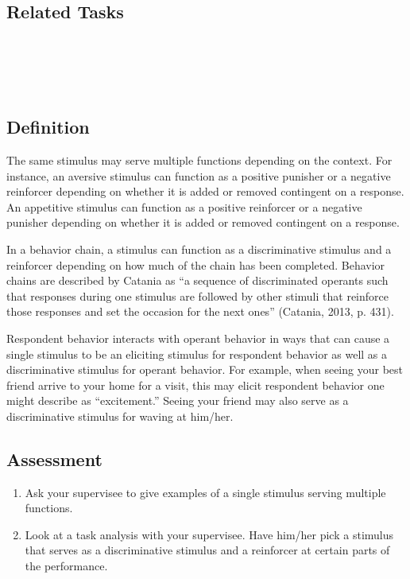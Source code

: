 \subsection{Related Tasks}
\fourdNineteen{}\\
\fourFKTwentyTwo{}\\
\fourFKTwentyNine{}\\
%
%
%
%
%
%
\section{\fourFKTwentyFive{}}
\subsection{Definition}
The same stimulus may serve multiple functions depending on the context. For instance, an aversive stimulus can function as a positive punisher or a negative reinforcer depending on whether it is added or removed contingent on a response. An appetitive stimulus can function as a positive reinforcer or a negative punisher depending on whether it is added or removed contingent on a response.

In a behavior chain, a stimulus can function as a discriminative stimulus and a reinforcer depending on how much of the chain has been completed. Behavior chains are described by Catania as ``a sequence of discriminated operants such that responses during one stimulus are followed by other stimuli that reinforce those responses and set the occasion for the next ones'' (Catania, 2013, p. 431).

Respondent behavior interacts with operant behavior in ways that can cause a single stimulus to be an eliciting stimulus for respondent behavior as well as a discriminative stimulus for operant behavior. For example, when seeing your best friend arrive to your home for a visit, this may elicit respondent behavior one might describe as ``excitement.'' Seeing your friend may also serve as a discriminative stimulus for waving at him/her.
%
\subsection{Assessment}
\begin{enumerate}
\item Ask your supervisee to give examples of a single stimulus serving multiple functions.
\item Look at a task analysis with your supervisee. Have him/her pick a stimulus that serves as a discriminative stimulus and a reinforcer at certain parts of the performance.
%
\end{enumerate}
%
